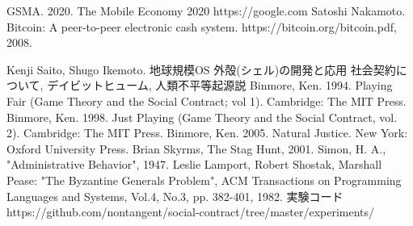 \documentclass[a4j]{ujreport}
\begin{document}
\begin{thebibliography}{数字}
   GSMA. 2020. The Mobile Economy 2020
   https://google.com
   Satoshi Nakamoto. Bitcoin: A peer-to-peer electronic cash system. https://bitcoin.org/bitcoin.pdf, 2008.

   Kenji Saito, Shugo Ikemoto. 地球規模OS 外殻(シェル)の開発と応用 
   社会契約について, デイビットヒューム,
   人類不平等起源説
   Binmore, Ken. 1994. Playing Fair (Game Theory and the Social Contract; vol 1). Cambridge: The MIT Press.
   Binmore, Ken. 1998. Just Playing (Game Theory and the Social Contract, vol. 2). Cambridge: The MIT Press.
   Binmore, Ken. 2005. Natural Justice. New York: Oxford University Press.
   Brian Skyrms, The Stag Hunt, 2001.
   Simon, H. A., "Administrative Behavior", 1947.
   Leslie Lamport, Robert Shostak, Marshall Pease: "The Byzantine Generals Problem", ACM Transactions on Programming Languages and Systems, Vol.4, No.3, pp. 382-401, 1982.
   実験コード https://github.com/nontangent/social-contract/tree/master/experiments/
\end{thebibliography}
\end{document}
